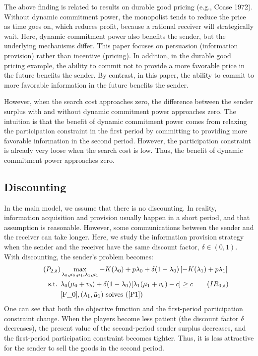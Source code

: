 \documentclass[11pt]{extarticle}
\begin{document}
The above finding is related to results on durable good pricing (e.g., Coase 1972). Without dynamic commitment power, the monopolist tends to reduce the price as time goes on, which reduces profit, because a rational receiver will strategically wait. Here, dynamic commitment power also benefits the sender, but the underlying mechanisms differ. This paper focuses on persuasion (information provision) rather than incentive (pricing). In addition, in the durable good pricing example, the ability to commit not to provide a more favorable price in the future benefits the sender. By contrast, in this paper, the ability to commit to more favorable information in the future benefits the sender.

However, when the search cost approaches zero, the difference between the sender surplus with and without dynamic commitment power approaches zero. The intuition is that the benefit of dynamic commitment power comes from relaxing the participation constraint in the first period by committing to providing more favorable information in the second period. However, the participation constraint is already very loose when the search cost is low. Thus, the benefit of dynamic commitment power approaches zero.


\subsection{Discounting}
In the main model, we assume that there is no discounting. In reality, information acquisition and provision usually happen in a short period, and that assumption is reasonable. However, some communications between the sender and the receiver can take longer. Here, we study the information provision strategy when the sender and the receiver have the same discount factor, $\delta \in (0,1)$. With discounting, the sender's problem becomes:
\begin{align}\tag{$P_{2,\delta}$} \label{P2delta}
& \max\limits_{\lambda_0, \bar{\mu_0}, \mu_1, \lambda_1, \bar{\mu_1}} -K(\lambda_0) + p \lambda_0 + \delta (1-\lambda_0) \left[-K(\lambda_1)+p \lambda_1 \right] \nonumber\\
\text{s.t. } &\lambda_0 (\bar{\mu_0} + v_b) + \delta(1-\lambda_0) [\lambda_1(\bar{\mu_1} + v_b)-c] \geq c \tag{$IR_{0,\delta}$} \label{IR_0^delta}\\
&\eqref{F_0},(\lambda_1,\bar{\mu}_1) \text{ solves (\ref{P1})} \nonumber
\end{align}
One can see that both the objective function and the first-period participation constraint change. When the players become less patient (the discount factor $\delta$ decreases), the present value of the second-period sender surplus decreases, and the first-period participation constraint becomes tighter. Thus, it is less attractive for the sender to sell the goods in the second period.
\end{document}

